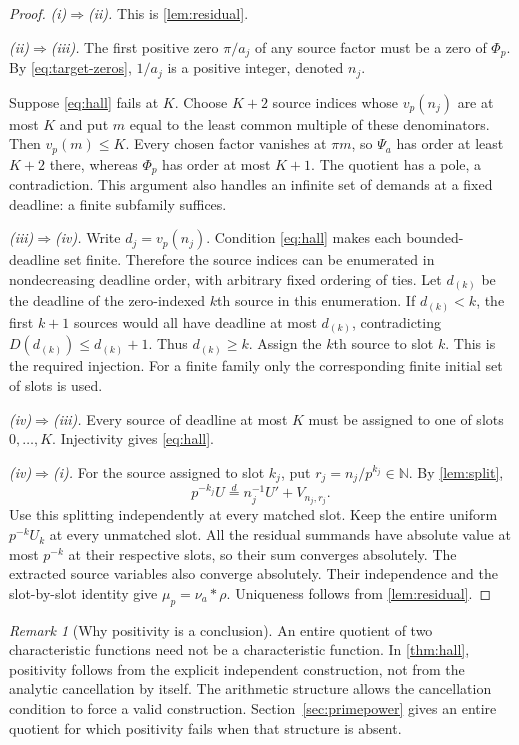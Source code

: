 \documentclass[11pt,a4paper]{article}
\theoremstyle{remark}
\newtheorem{remark}[theorem]{Remark}
\newcommand{\N}{\mathbb N}
\newcommand{\eqd}{\overset{d}{=}}
\begin{document}
\begin{proof}
\emph{(i)$\Rightarrow$(ii).} This is \cref{lem:residual}.

\emph{(ii)$\Rightarrow$(iii).} The first positive zero $\pi/a_j$ of any source
factor must be a zero of $\Phi_p$. By \eqref{eq:target-zeros}, $1/a_j$ is a
positive integer, denoted $n_j$.

Suppose \eqref{eq:hall} fails at $K$. Choose $K+2$ source indices whose
$v_p(n_j)$ are at most $K$ and put $m$ equal to the least common multiple of
these denominators. Then $v_p(m)\le K$. Every chosen factor vanishes at $\pi m$,
so $\Psi_a$ has order at least $K+2$ there, whereas $\Phi_p$ has order at most
$K+1$. The quotient has a pole, a contradiction. This argument also handles
an infinite set of demands at a fixed deadline: a finite subfamily suffices.

\emph{(iii)$\Rightarrow$(iv).} Write $d_j=v_p(n_j)$. Condition
\eqref{eq:hall} makes each bounded-deadline set finite. Therefore the source
indices can be enumerated in nondecreasing deadline order, with arbitrary
fixed ordering of ties. Let $d_{(k)}$ be the deadline of the zero-indexed
$k$th source in this enumeration. If $d_{(k)}<k$, the first $k+1$ sources
would all have deadline at most $d_{(k)}$, contradicting
$D(d_{(k)})\le d_{(k)}+1$. Thus $d_{(k)}\ge k$.
Assign the $k$th source to slot $k$. This is the required injection.
For a finite family only the corresponding finite initial set of slots is used.

\emph{(iv)$\Rightarrow$(iii).} Every source of deadline at most $K$ must be
assigned to one of slots $0,\ldots,K$. Injectivity gives \eqref{eq:hall}.

\emph{(iv)$\Rightarrow$(i).} For the source assigned to slot $k_j$, put
$r_j=n_j/p^{k_j}\in\N$. By \cref{lem:split},
\[
 p^{-k_j}U\eqd n_j^{-1}U'+V_{n_j,r_j}.
\]
Use this splitting independently at every matched slot. Keep the entire uniform
$p^{-k}U_k$ at every unmatched slot. All the residual summands have absolute
value at most $p^{-k}$ at their respective slots, so their sum converges
absolutely. The extracted source variables also converge absolutely. Their
independence and the slot-by-slot identity give
$\mu_p=\nu_a*\rho$. Uniqueness follows from \cref{lem:residual}.
\end{proof}

\begin{remark}[Why positivity is a conclusion]
An entire quotient of two characteristic functions need not be a characteristic
function. In \cref{thm:hall}, positivity follows from the explicit independent
construction, not from the analytic cancellation by itself. The arithmetic
structure allows the cancellation condition to force a valid construction.
Section~\ref{sec:primepower} gives an entire quotient for which positivity fails
when that structure is absent.
\end{remark}
\end{document}
